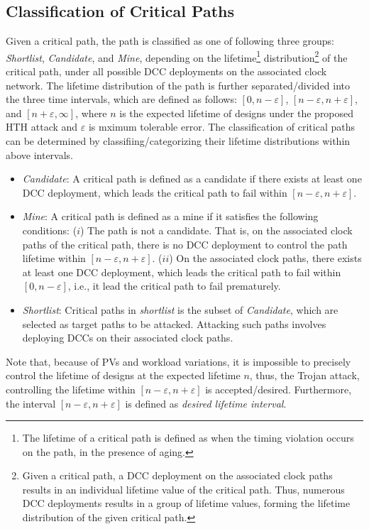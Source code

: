 \subsection{Classification of Critical Paths}
\label{sec:frame:cp}
Given a critical path, the path is classified as one of following three groups: \textit{Shortlist}, \textit{Candidate}, and \textit{Mine}, depending on the lifetime\footnote{The lifetime of a critical path is defined as when the timing violation occurs on the path, in the presence of aging.} distribution\footnote{Given a critical path, a DCC deployment on the associated clock paths results in an individual lifetime value of the critical path. Thus, numerous DCC deployments results in a group of lifetime values, forming the lifetime distribution of the given critical path.} of the critical path, under all possible DCC deployments on the associated clock network. The lifetime distribution of the path is further separated/divided into the three time intervals, which are defined as follows: $[0, n - \varepsilon]$, $[n - \varepsilon, n + \varepsilon]$, and $[n + \varepsilon, \infty]$, where $n$ is the expected lifetime of designs under the proposed HTH attack and $\varepsilon$ is mximum tolerable error. The classification of critical paths can be determined by classifiing/categorizing their lifetime distributions within above intervals. 
\begin{itemize}
	\item \textit{Candidate}: A critical path is defined as a candidate if there exists at least one DCC deployment, which leads the critical path to fail within $[n - \varepsilon, n + \varepsilon]$.
	\item \textit{Mine}: A critical path is defined as a mine if it satisfies the following conditions: ($i$) The path is not a candidate. That is, on the associated clock paths of the critical path, there is no DCC deployment to control the path lifetime within $[n - \varepsilon, n + \varepsilon]$. ($ii$) On the associated clock paths, there exists at least one DCC deployment, which leads the critical path to fail within $[0, n - \varepsilon]$, i.e., it lead the critical path to fail prematurely.
	\item \textit{Shortlist}:  Critical paths in \textit{shortlist} is the subset of \textit{Candidate}, which are selected as target paths to be attacked. Attacking such paths involves deploying DCCs on their associated clock paths.
\end{itemize}

Note that, because of PVs and workload variations, it is impossible to precisely control the lifetime of designs at the expected lifetime $n$, thus, the Trojan attack, controlling the lifetime within $[n-\varepsilon, n+\varepsilon]$ is accepted/desired. Furthermore, the interval $[n - \varepsilon, n + \varepsilon]$ is defined as \textit{desired lifetime interval}. 

